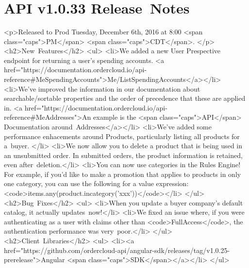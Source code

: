 \documentclass{memoir}%
\begin{document}
%
\section*{API v1.0.33 Release~Notes}%
\paragraph*{}%

%
\paragraph*{}%
<p>Released to Prod Tuesday, December 6th, 2016 at 8:00 <span class="caps">PM</span> <span class="caps">CDT</span>. </p>\newline%
<h2>New~Features</h2>\newline%
<ul>\newline%
<li>We added a new User Prespective endpoint for returning a user’s spending accounts. <a href="https://documentation.ordercloud.io/api{-}reference\#MeSpendingAccounts">Me/ListSpendingAccounts</a></li>\newline%
<li>We’ve improved the information in our documentation about searchable/sortable properties and the order of precedence that these are applied in. <a href="https://documentation.ordercloud.io/api{-}reference\#MeAddresses">An example is the <span class="caps">API</span> Documentation around~Addresses</a></li>\newline%
<li>We’ve added some performance enhacements around Products, particularly listing all products for a~buyer. </li>\newline%
<li>We now allow you to delete a product that is being used in an unsubmitted order. In submitted orders, the product information is retained, even after~deletion.</li>\newline%
<li>You can now use categories in the Rules Engine! For example, if you’d like to make a promotion that applies to products in only one category, you can use the following for a value expression: <code>items.any(product.incategory('xxx'))</code></li>\newline%
</ul>\newline%
<h2>Bug~Fixes</h2>\newline%
<ul>\newline%
<li>When you update a buyer company’s default catalog, it actually updates~now!</li>\newline%
<li>We fixed an issue where, if you were authenticating as a user with claims other than <code>FullAccess</code>, the authentication performance was very~poor.</li>\newline%
</ul>\newline%
<h2>Client~Libraries</h2>\newline%
<ul>\newline%
<li><a href="https://github.com/ordercloud{-}api/angular{-}sdk/releases/tag/v1.0.25{-}prerelease">Angular <span class="caps">SDK</span></a></li>\newline%
</ul>
\end{document}
